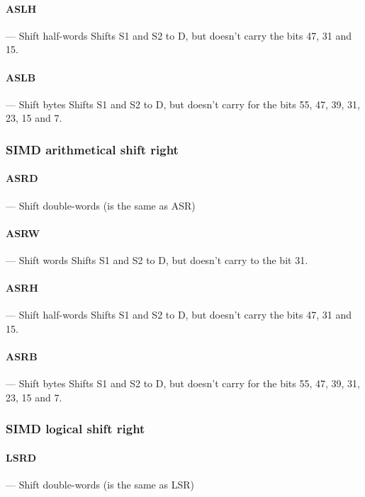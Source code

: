 \documentclass[11pt]{article}
\begin{document}
\paragraph{ASLH} --- Shift half-words\newline
Shifts S1 and S2 to D, but doesn't carry the bits 47, 31 and 15.

\paragraph{ASLB} --- Shift bytes\newline
Shifts S1 and S2 to D, but doesn't carry for the bits 55, 47, 39, 31, 23, 15
and 7.

\subsubsection{SIMD arithmetical shift right}

\paragraph{ASRD} --- Shift double-words (is the same as ASR)\newline

\paragraph{ASRW} --- Shift words\newline
Shifts S1 and S2 to D, but doesn't carry to the bit 31.

\paragraph{ASRH} --- Shift half-words\newline
Shifts S1 and S2 to D, but doesn't carry the bits 47, 31 and 15.

\paragraph{ASRB} --- Shift bytes\newline
Shifts S1 and S2 to D, but doesn't carry for the bits 55, 47, 39, 31, 23, 15
and 7.

\subsubsection{SIMD logical shift right}

\paragraph{LSRD} --- Shift double-words (is the same as LSR)\newline
\end{document}

